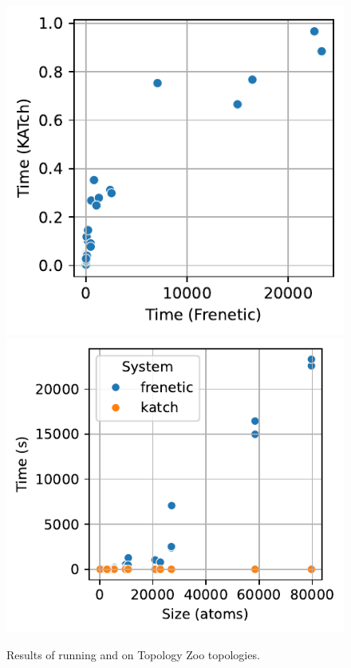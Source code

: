 \documentclass[acmsmall,dvipsnames,nonacm]{acmart}
\begin{document}
\begin{figure}
  \scalebox{0.85}{}\\
    \includegraphics[scale=0.6]{plots/Topology Zoo_scatter.pdf}
    \includegraphics[scale=0.6]{plots/Topology Zoo_time_vs_size.pdf}
  \caption{Results of running \KATch{} and \Frenetic on Topology Zoo topologies.}\label{fig:topology-zoo}
\end{figure}
\end{document}
